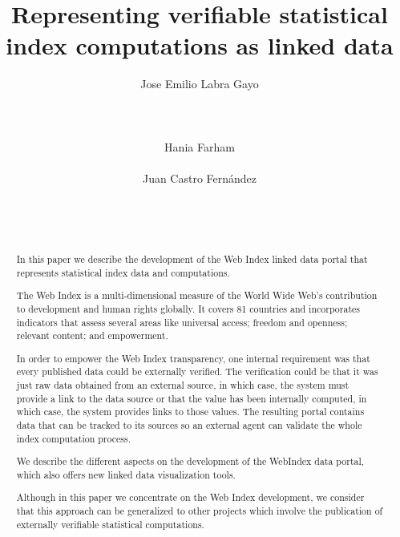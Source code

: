 \documentclass{acm_proc_article-sp}
\begin{document}
\title{Representing verifiable statistical index computations as linked data}

\author{
\alignauthor
Jose Emilio Labra Gayo\\
       \\
       \\
       \\
\alignauthor
Hania Farham\\
       \\
\alignauthor
Juan Castro Fernández\\
        \\
       \\
       \\
}

\maketitle
\begin{abstract}

In this paper we describe the development of the Web Index linked data portal that represents statistical index data and computations. 

 The Web Index is a multi-dimensional measure of the World Wide Web’s contribution to development and human rights globally. It covers 81 countries and incorporates indicators that assess several areas like universal access; freedom and openness; relevant content; and empowerment.

In order to empower the Web Index transparency, one internal requirement was that every published data could be externally verified. 
The verification could be that it was just raw data obtained from an external source, in which case, the system must provide a link to the data source or that the value has been internally computed, 
 in which case, the system provides links to those values.
The resulting portal contains data that can be tracked to its sources so an external agent
can validate the whole index computation process.

We describe the different aspects on the development of the WebIndex data portal, which also offers new linked data visualization tools. 

Although in this paper we concentrate on the Web Index development, 
we consider that this approach can be generalized to other projects which involve 
 the publication of externally verifiable statistical computations.
\end{abstract}
\end{document}
